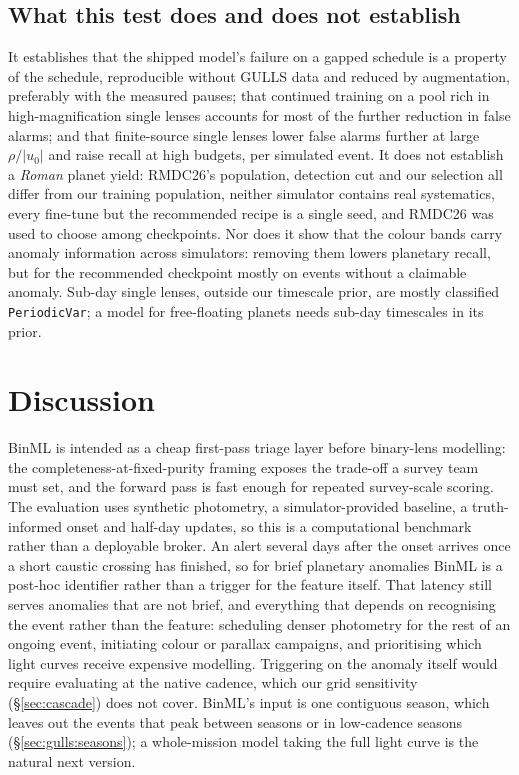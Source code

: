 \documentclass[twocolumn,linenumbers,floatfix,twocolappendix]{aastex701}
\newcommand{\Rom}{\textit{Roman}}
\begin{document}
\subsection{What this test does and does not establish}

It establishes that the shipped model's failure on a gapped schedule is a property of the schedule, reproducible
without GULLS data and reduced by augmentation, preferably with the measured pauses; that continued training on a
pool rich in high-magnification single lenses accounts for most of the further reduction in false alarms; and that
finite-source single lenses lower false alarms further at large $\rho/|u_0|$ and raise recall at high budgets, per
simulated event. It does not establish a \Rom{} planet yield: RMDC26's population, detection cut and our selection all
differ from our training population, neither simulator contains real systematics, every fine-tune but the recommended
recipe is a single seed, and RMDC26 was used to choose among checkpoints. Nor does it show that the colour bands carry
anomaly information across simulators: removing them lowers planetary recall, but for the recommended checkpoint mostly
on events without a claimable anomaly. Sub-day single lenses, outside our timescale prior, are mostly
classified \texttt{PeriodicVar}; a model for free-floating planets needs sub-day timescales in its prior.

\section{Discussion}\label{sec:discussion}

BinML is intended as a cheap first-pass triage layer before binary-lens modelling: the completeness-at-fixed-purity
framing exposes the trade-off a survey team must set, and the forward pass is fast enough for repeated survey-scale
scoring. The evaluation uses synthetic photometry, a simulator-provided baseline, a truth-informed onset and half-day
updates, so this is a computational benchmark rather than a deployable broker. An alert several days after the onset
arrives once a short caustic crossing has finished, so for brief planetary anomalies BinML is a post-hoc identifier
rather than a trigger for the feature itself. That latency still serves anomalies that are not brief, and everything
that depends on recognising the event rather than the feature: scheduling denser photometry for the rest of an ongoing
event, initiating colour or parallax campaigns, and prioritising which light curves receive expensive modelling.
Triggering on the anomaly itself would require evaluating at the native cadence, which our grid sensitivity
(\S\ref{sec:cascade}) does not cover. BinML's input is one contiguous season, which leaves out the events that peak
between seasons or in low-cadence seasons (\S\ref{sec:gulls:seasons}); a whole-mission model taking the full light
curve is the natural next version.
\end{document}
